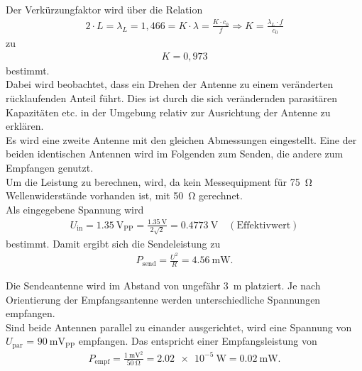 \documentclass[a4paper,twoside,final]{article}
\begin{document}
Der Verkürzungfaktor wird über die Relation
\begin{align}
2\cdot L = \lambda_{L} = 1,466 = K \cdot \lambda = \frac{K\cdot c_0}{f} \Rightarrow K = \frac{\lambda_L \cdot f}{c_0}
\end{align}
zu
\begin{align}
K = 0,973
\end{align}
bestimmt.\\

Dabei wird beobachtet, dass ein Drehen der Antenne zu einem veränderten rücklaufenden Anteil führt. Dies ist durch die sich verändernden parasitären Kapazitäten etc. in der Umgebung relativ zur Ausrichtung der Antenne zu erklären.  \\
Es wird eine zweite Antenne mit den gleichen Abmessungen eingestellt. Eine der beiden identischen Antennen wird im Folgenden zum Senden, die andere zum Empfangen genutzt. \\
Um die Leistung zu berechnen, wird, da kein Messequipment für \SI{75}{\ohm} Wellenwiderstände vorhanden ist, mit \SI{50}{\ohm} gerechnet. \\
Als eingegebene Spannung wird
\begin{align}
U_\text{in} = \SI{1,35}{\volt_\text{PP}} = \frac{\SI{1,35}{\volt}}{2\sqrt{2}} = \SI{0,4773}{\volt}\quad (\text{Effektivwert})
\end{align}
bestimmt. Damit ergibt sich die Sendeleistung zu
\begin{align}
P_\text{send} = \frac{U^2}{R} =  \SI{4,56}{\milli\watt}.
\end{align}

Die Sendeantenne wird im Abstand von ungefähr \SI{3}{\metre} platziert. Je nach Orientierung der Empfangsantenne werden unterschiedliche Spannungen empfangen. \\
Sind beide Antennen parallel zu einander ausgerichtet, wird eine Spannung von $U_\text{par}$ = $\SI{90}{\milli\volt_\text{PP}}$ empfangen. Das entspricht einer Empfangsleistung von
\begin{align}
P_\text{empf} =   \frac{\SI{1}{\milli\volt\squared}}{\SI{50}{\ohm}} = \SI{2,02e-5}{\watt} = \SI{0,02}{\milli\watt}.
\end{align}
\end{document}
